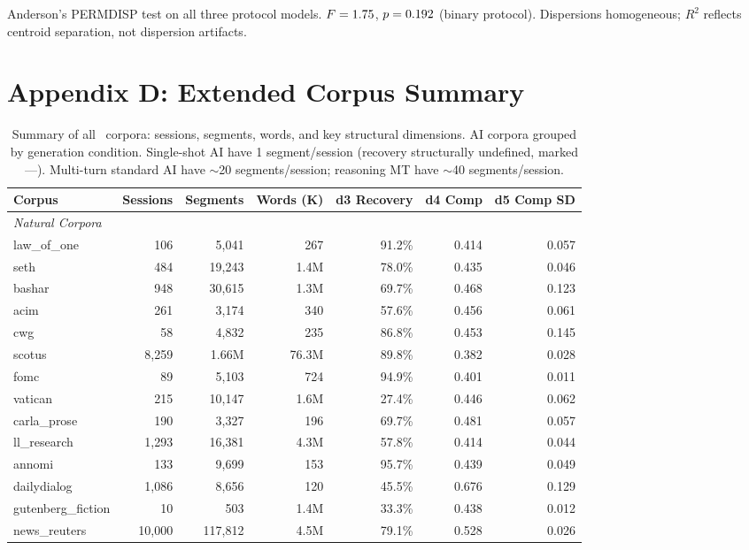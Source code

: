\documentclass[11pt]{article}
\begin{document}
Anderson's PERMDISP test on all three protocol models. $F = 1.75$, $p = 0.192$ (binary protocol). Dispersions homogeneous; $R^2$ reflects centroid separation, not dispersion artifacts.

\clearpage

\section{Appendix D: Extended Corpus Summary}

\begin{table}[h!]
\centering
\tiny
\caption{Summary of all \nCorpora\ corpora: sessions, segments, words, and key structural dimensions. AI corpora grouped by generation condition. Single-shot AI have 1 segment/session (recovery structurally undefined, marked ---). Multi-turn standard AI have $\sim$20 segments/session; reasoning MT have $\sim$40 segments/session.}
\label{tbl:corpus-summary}
\begin{tabular}{lrrrrrr}
\toprule
\textbf{Corpus} & \textbf{Sessions} & \textbf{Segments} & \textbf{Words (K)} & \textbf{d3 Recovery} & \textbf{d4 Comp} & \textbf{d5 Comp SD} \\
\midrule
\multicolumn{7}{l}{\textit{Natural Corpora}} \\
law\_of\_one & 106 & 5,041 & 267 & 91.2\% & 0.414 & 0.057 \\
seth & 484 & 19,243 & 1.4M & 78.0\% & 0.435 & 0.046 \\
bashar & 948 & 30,615 & 1.3M & 69.7\% & 0.468 & 0.123 \\
acim & 261 & 3,174 & 340 & 57.6\% & 0.456 & 0.061 \\
cwg & 58 & 4,832 & 235 & 86.8\% & 0.453 & 0.145 \\
scotus & 8,259 & 1.66M & 76.3M & 89.8\% & 0.382 & 0.028 \\
fomc & 89 & 5,103 & 724 & 94.9\% & 0.401 & 0.011 \\
vatican & 215 & 10,147 & 1.6M & 27.4\% & 0.446 & 0.062 \\
carla\_prose & 190 & 3,327 & 196 & 69.7\% & 0.481 & 0.057 \\
ll\_research & 1,293 & 16,381 & 4.3M & 57.8\% & 0.414 & 0.044 \\
annomi & 133 & 9,699 & 153 & 95.7\% & 0.439 & 0.049 \\
dailydialog & 1,086 & 8,656 & 120 & 45.5\% & 0.676 & 0.129 \\
gutenberg\_fiction & 10 & 503 & 1.4M & 33.3\% & 0.438 & 0.012 \\
news\_reuters & 10,000 & 117,812 & 4.5M & 79.1\% & 0.528 & 0.026 \\

\end{tabular}
\end{table}
\end{document}
